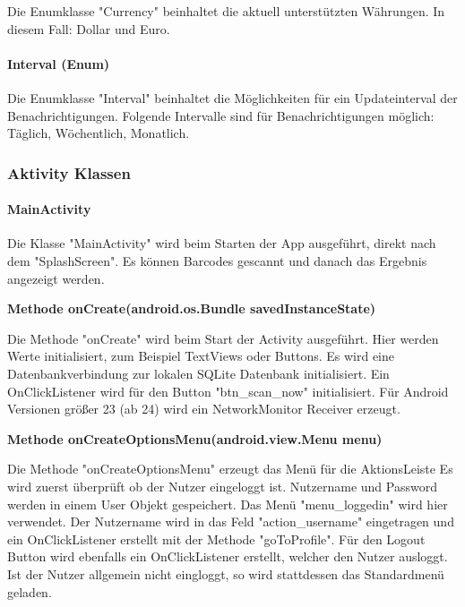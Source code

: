 \documentclass{scrartcl}
\begin{document}
Die Enumklasse "Currency" beinhaltet die aktuell unterstützten Währungen. In diesem Fall: Dollar und Euro.

\paragraph{Interval (Enum)}

Die Enumklasse "Interval" beinhaltet die Möglichkeiten für ein Updateinterval der Benachrichtigungen. Folgende Intervalle sind für Benachrichtigungen möglich: Täglich, Wöchentlich, Monatlich.

\newpage

\subsubsection{Aktivity Klassen}

\paragraph{MainActivity}

\noindent Die Klasse "MainActivity" wird beim Starten der App ausgeführt, direkt nach dem "SplashScreen". Es können Barcodes gescannt und danach das Ergebnis angezeigt werden.\newline

\noindent\textbf{Methode onCreate(android.os.Bundle savedInstanceState)}

\noindent Die Methode "onCreate" wird beim Start der Activity ausgeführt. Hier werden Werte initialisiert, zum Beispiel TextViews oder Buttons. Es wird eine Datenbankverbindung zur lokalen SQLite Datenbank initialisiert. Ein OnClickListener wird für den Button "btn\_scan\_now" initialisiert. Für Android Versionen größer 23 (ab 24) wird ein NetworkMonitor Receiver erzeugt.\newline

\noindent\textbf{Methode onCreateOptionsMenu(android.view.Menu menu)}

\noindent Die Methode "onCreateOptionsMenu" erzeugt das Menü für die AktionsLeiste Es wird zuerst überprüft ob der Nutzer eingeloggt ist. Nutzername und Password werden in einem User Objekt gespeichert. Das Menü "menu\_loggedin" wird hier verwendet. Der Nutzername wird in das Feld "action\_username" eingetragen und ein OnClickListener erstellt mit der Methode "goToProfile". Für den Logout Button wird ebenfalls ein OnClickListener erstellt, welcher den Nutzer ausloggt. Ist der Nutzer allgemein nicht eingloggt, so wird stattdessen das Standardmenü geladen. \newline
\end{document}
